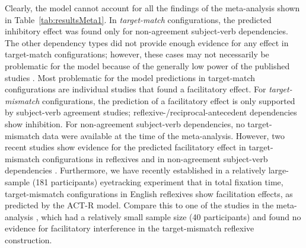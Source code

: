 \documentclass{cambridge7A}\usepackage[]{graphicx}\usepackage[]{color}
\newcommand{\revised}[1]{#1}
\begin{document}
Clearly, the model cannot account for all the findings of the meta-analysis shown in Table~\ref{tab:resultsMeta1}. 
In \emph{target-match} configurations, the predicted inhibitory effect was found only for non-agreement subject-verb dependencies. The other dependency types did not provide enough evidence for any effect in target-match configurations; however, these cases may not necessarily be problematic for the model because of the generally low power of the published studies  \citep[see][for discussion]{NicenboimEtAlCogSci2018,JaegerEngelmannVasishth2017,VasishthMertzenJaegerGelman2018,JaegerMertzenVanDykeVasishth2019}. 
Most problematic for the model predictions in target-match configurations are individual studies that found a facilitatory effect. 
For \emph{target-mismatch} configurations, the prediction of a facilitatory effect is only supported by subject-verb agreement studies; reflexive-/reciprocal-antecedent dependencies show inhibition. For non-agreement subject-verb dependencies, no target-mismatch data were available at the time of the meta-analysis. However, two recent studies show evidence for the predicted facilitatory effect in target-mismatch configurations in reflexives \citep{parker2017reflexive} and in non-agreement subject-verb dependencies \citep{CunningsSturt2018}. \revised{Furthermore, we have recently established in a relatively large-sample (181 participants) eyetracking experiment \citep{JaegerMertzenVanDykeVasishth2019} that in total fixation time, target-mismatch configurations in English reflexives show facilitation effects, as predicted by the ACT-R model. Compare this to one of the studies in the meta-analysis  \citep{DillonMishlerSloggett2013}, which had a relatively small sample size (40 participants) and found no evidence for facilitatory interference in the target-mismatch reflexive construction.}
\end{document}

